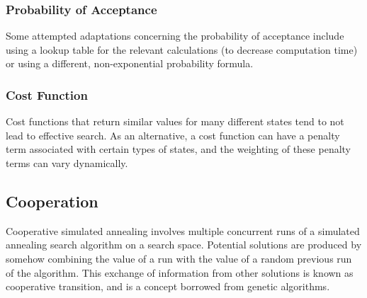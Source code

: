 \documentclass[12pt,titlepage]{article}
\begin{document}
      \subsubsection{Probability of Acceptance}
        Some attempted adaptations concerning the probability of acceptance include using a lookup table for the relevant calculations (to decrease computation time) or using a different,
        non-exponential probability formula.

      \subsubsection{Cost Function}
        Cost functions that return similar values for many different states tend to not lead to effective search. As an alternative, a cost function can have a penalty term associated with
        certain types of states, and the weighting of these penalty terms can vary dynamically.

    \subsection{Cooperation}
      Cooperative simulated annealing involves multiple concurrent runs of a simulated annealing search algorithm on a search space. Potential solutions are produced by somehow combining
      the value of a run with the value of a random previous run of the algorithm. This exchange of information from other solutions is known as cooperative transition, and is a concept
      borrowed from genetic algorithms.
\end{document}
